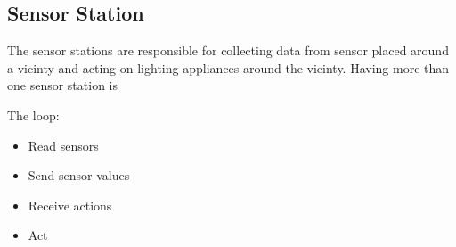 \subsection{Sensor Station}\label{sub:sensorStation}

The sensor stations are responsible for collecting data from sensor placed around a vicinty and acting on lighting appliances around the vicinty. Having more than one sensor station is 

The loop:
\begin{itemize}
  \item Read sensors
  \item Send sensor values
  \item Receive actions
  \item Act
\end{itemize}
